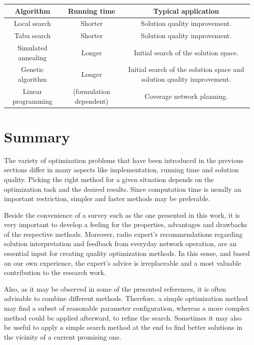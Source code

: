 \begin{table}

{\footnotesize }%
\begin{tabular}{|c|c|c|}
\hline 
{\footnotesize Algorithm} & {\footnotesize Running time} & {\footnotesize Typical application}\tabularnewline
\hline 
\hline 
{\footnotesize Local search} & {\footnotesize Shorter} & {\footnotesize Solution quality improvement.}\tabularnewline
\hline 
{\footnotesize Tabu search} & {\footnotesize Shorter} & {\footnotesize Solution quality improvement.}\tabularnewline
\hline 
{\footnotesize Simulated annealing} & {\footnotesize Longer} & {\footnotesize Initial search of the solution space.}\tabularnewline
\hline 
{\footnotesize Genetic algorithm} & {\footnotesize Longer} & {\footnotesize Initial search of the solution space and solution quality
improvement.}\tabularnewline
\hline 
{\footnotesize Linear programming} & {\footnotesize (formulation dependent)} & {\footnotesize Coverage network planning.}\tabularnewline
\hline 
\end{tabular}
\end{table}



\section{Summary}

The variety of optimization problems that have been introduced in
the previous sections differ in many aspects like implementation,
running time and solution quality. Picking the right method for a
given situation depends on the optimization task and the desired results.
Since computation time is usually an important restriction, simpler
and faster methods may be preferable. 

Beside the convenience of a survey such as the one presented in this
work, it is very important to develop a feeling for the properties,
advantages and drawbacks of the respective methods. Moreover, radio
expert's recommendations regarding solution interpretation and feedback
from everyday network operation, are an essential input for creating
quality optimization methods. In this sense, and based on our own
experience, the expert's advice is irreplaceable and a most valuable
contribution to the research work.

Also, as it may be observed in some of the presented references, it
is often advisable to combine different methods. Therefore, a simple
optimization method may find a subset of reasonable parameter configuration,
whereas a more complex method could be applied afterward, to refine
the search. Sometimes it may also be useful to apply a simple search
method at the end to find better solutions in the vicinity of a current
promising one.
